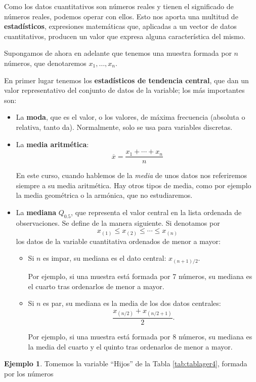 \documentclass[
]{book}
\theoremstyle{definition}
\theoremstyle{definition}
\newtheorem{example}{Ejemplo}[chapter]
\theoremstyle{definition}
\theoremstyle{definition}
\theoremstyle{remark}
\begin{document}
Como los datos cuantitativos son números reales y tienen el significado de números reales, podemos operar con ellos. Esto nos aporta una multitud de \textbf{estadísticos}, expresiones matemáticas que, aplicadas a un vector de datos cuantitativos, producen un valor que expresa alguna característica del mismo.

Supongamos de ahora en adelante que tenemos una muestra formada por \(n\) números, que denotaremos \(x_1,\ldots,x_n\).

En primer lugar tenemos los \textbf{estadísticos de tendencia central}, que dan un valor representativo del conjunto de datos de la variable; los más importantes son:

\begin{itemize}
\item
  La \textbf{moda}, que es el valor, o los valores, de máxima frecuencia (absoluta o relativa, tanto da). Normalmente, solo se usa para variables discretas.
\item
  La \textbf{media aritmética}:
  \[
   \overline{x}=\frac{x_1+\cdots+x_n}{n}
  \]

  En este curso, cuando hablemos de la \emph{media} de unos datos nos referiremos siempre a su media aritmética. Hay otros tipos de media, como por ejemplo la media geométrica o la armónica, que no estudiaremos.
\item
  La \textbf{mediana} \(Q_{0.5}\), que representa el valor central en la lista ordenada de observaciones. Se define de la manera siguiente. Si denotamos por
  \[
  x_{(1)}\leqslant x_{(2)}\leqslant \cdots \leqslant x_{(n)}
  \]
  los datos de la variable cuantitativa ordenados de menor a mayor:

  \begin{itemize}
  \item
    Si \(n\) es impar, su mediana es el dato central: \(x_{(n+1)/2}\).

    Por ejemplo, si una muestra está formada por 7 números, su mediana es el cuarto tras ordenarlos de menor a mayor.
  \item
    Si \(n\) es par, su mediana es la media de los dos datos centrales:
    \[
    \frac{x_{(n/2)}+x_{(n/2+1)}}{2}.
    \]

    Por ejemplo, si una muestra está formada por 8 números, su mediana es la media del cuarto y el quinto tras ordenarlos de menor a mayor.
  \end{itemize}
\end{itemize}

\begin{example}
\protect\hypertarget{exm:sexoger5}{}\label{exm:sexoger5}Tomemos la variable ``Hijos'' de la Tabla \ref{tab:tablager4}, formada por los números
\end{example}
\end{document}
